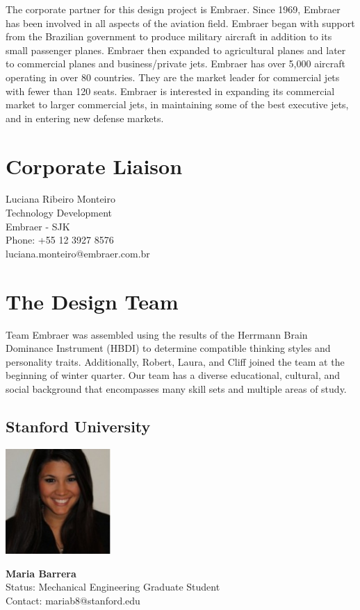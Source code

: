 The corporate partner for this design project is Embraer.  Since 1969, Embraer has been involved in all aspects of the aviation field.  Embraer began with support from the Brazilian government to produce military aircraft in addition to its small passenger planes.  Embraer then expanded to agricultural planes and later to commercial planes and business/private jets.  Embraer has over 5,000 aircraft operating in over 80 countries.  They are the market leader for commercial jets with fewer than 120 seats.  Embraer is interested in expanding its commercial market to larger commercial jets, in maintaining some of the best executive jets, and in entering new defense markets.

\section*{Corporate Liaison}
Luciana Ribeiro Monteiro \\
  Technology Development \\
  Embraer - SJK \\
  Phone: +55 12 3927 8576 \\
  luciana.monteiro@embraer.com.br

\section{The Design Team}
Team Embraer was assembled using the results of the Herrmann Brain Dominance Instrument (HBDI) to determine compatible thinking styles and personality traits. Additionally, Robert, Laura, and Cliff joined the team at the beginning of winter quarter.  Our team has a diverse educational, cultural, and social background that encompasses many skill sets and multiple areas of study. 

\subsection*{Stanford University}


\noindent \includegraphics[width=40mm]{images/image011.jpg}
\parbox[b]{0.6\textwidth}{\textbf{Maria Barrera}\\
Status: Mechanical Engineering Graduate Student\\
Contact: mariab8@stanford.edu\\
}

